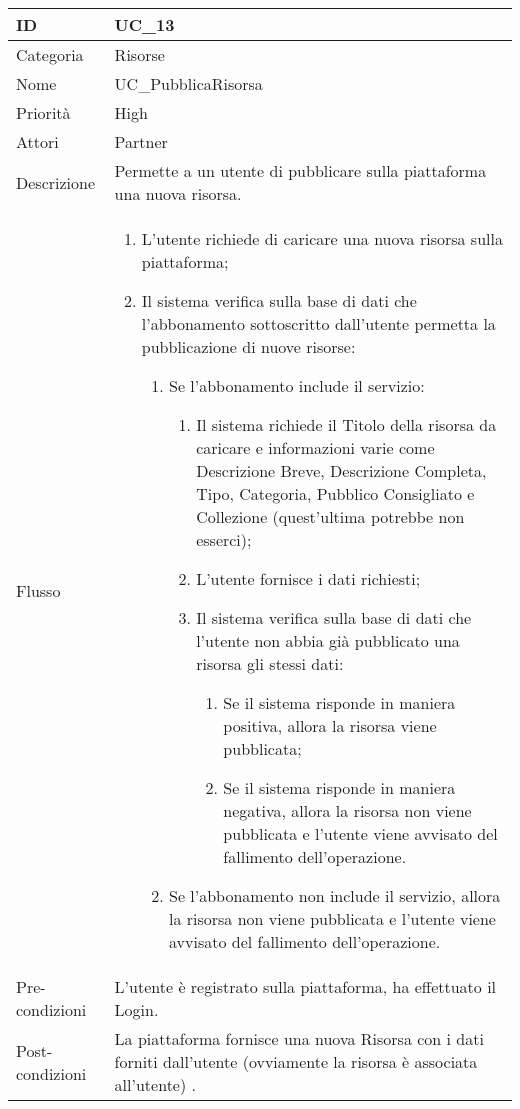 \begin{center}
\begin{tabular}{ |p{2cm}|p{13cm}|  }
\hline
ID & UC\_13 \\\hline
Categoria & Risorse\\\hline
Nome & UC\_PubblicaRisorsa\\\hline
Priorità & High \\\hline
Attori &  Partner\\\hline
Descrizione & Permette a un utente di pubblicare sulla piattaforma una nuova risorsa.\\\hline
Flusso &  	\begin{enumerate}
			\item L'utente richiede di caricare una nuova risorsa sulla piattaforma;
			\item Il sistema verifica sulla base di dati che l'abbonamento sottoscritto dall'utente permetta la pubblicazione di nuove risorse:
			\begin{enumerate}
				\item Se l'abbonamento include il servizio:
				\begin{enumerate}
					\item Il sistema richiede il Titolo della risorsa da caricare e informazioni varie come Descrizione Breve,  Descrizione Completa, Tipo, Categoria, Pubblico Consigliato e Collezione (quest'ultima potrebbe non esserci);
					\item L'utente fornisce i dati richiesti;
					\item Il sistema verifica sulla base di dati che l'utente non abbia già pubblicato una risorsa gli stessi dati:
					\begin{enumerate}
						\item Se il sistema risponde in maniera positiva, allora la risorsa viene pubblicata;
						\item Se il sistema risponde in maniera negativa, allora  la risorsa non viene pubblicata e l'utente viene avvisato del fallimento dell'operazione.
					\end{enumerate}
				\end{enumerate}
				\item Se l'abbonamento non include il servizio, allora la risorsa non viene pubblicata e l'utente viene avvisato del fallimento dell'operazione.
			\end{enumerate}
		\end{enumerate}\\\hline
Pre-condizioni & L'utente è registrato sulla piattaforma, ha effettuato il Login.\\\hline
Post-condizioni & La piattaforma fornisce una nuova Risorsa con i dati forniti dall'utente (ovviamente la risorsa è associata all'utente) .\\\hline
\end{tabular}
\label{table_use_case:13} \newline


\end{center}
